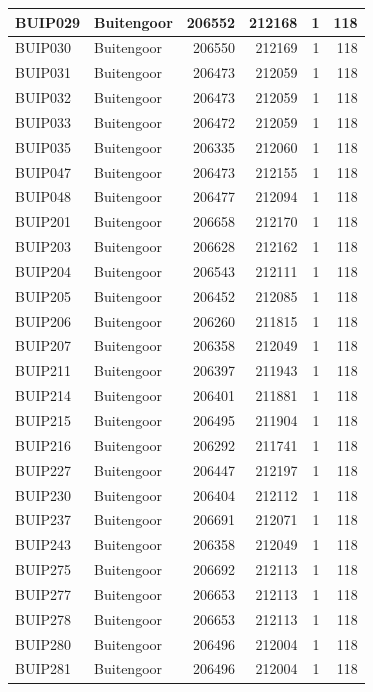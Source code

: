 \documentclass[11pt,]{book}
\begin{document}
\begin{table}
\begin{tabular}[t]{l|l|r|r|r|r}
\hline
BUIP029 & Buitengoor & 206552 & 212168 & 1 & 118\\
\hline
BUIP030 & Buitengoor & 206550 & 212169 & 1 & 118\\
\hline
BUIP031 & Buitengoor & 206473 & 212059 & 1 & 118\\
\hline
BUIP032 & Buitengoor & 206473 & 212059 & 1 & 118\\
\hline
BUIP033 & Buitengoor & 206472 & 212059 & 1 & 118\\
\hline
BUIP035 & Buitengoor & 206335 & 212060 & 1 & 118\\
\hline
BUIP047 & Buitengoor & 206473 & 212155 & 1 & 118\\
\hline
BUIP048 & Buitengoor & 206477 & 212094 & 1 & 118\\
\hline
BUIP201 & Buitengoor & 206658 & 212170 & 1 & 118\\
\hline
BUIP203 & Buitengoor & 206628 & 212162 & 1 & 118\\
\hline
BUIP204 & Buitengoor & 206543 & 212111 & 1 & 118\\
\hline
BUIP205 & Buitengoor & 206452 & 212085 & 1 & 118\\
\hline
BUIP206 & Buitengoor & 206260 & 211815 & 1 & 118\\
\hline
BUIP207 & Buitengoor & 206358 & 212049 & 1 & 118\\
\hline
BUIP211 & Buitengoor & 206397 & 211943 & 1 & 118\\
\hline
BUIP214 & Buitengoor & 206401 & 211881 & 1 & 118\\
\hline
BUIP215 & Buitengoor & 206495 & 211904 & 1 & 118\\
\hline
BUIP216 & Buitengoor & 206292 & 211741 & 1 & 118\\
\hline
BUIP227 & Buitengoor & 206447 & 212197 & 1 & 118\\
\hline
BUIP230 & Buitengoor & 206404 & 212112 & 1 & 118\\
\hline
BUIP237 & Buitengoor & 206691 & 212071 & 1 & 118\\
\hline
BUIP243 & Buitengoor & 206358 & 212049 & 1 & 118\\
\hline
BUIP275 & Buitengoor & 206692 & 212113 & 1 & 118\\
\hline
BUIP277 & Buitengoor & 206653 & 212113 & 1 & 118\\
\hline
BUIP278 & Buitengoor & 206653 & 212113 & 1 & 118\\
\hline
BUIP280 & Buitengoor & 206496 & 212004 & 1 & 118\\
\hline
BUIP281 & Buitengoor & 206496 & 212004 & 1 & 118\\

\end{tabular}
\end{table}
\end{document}
